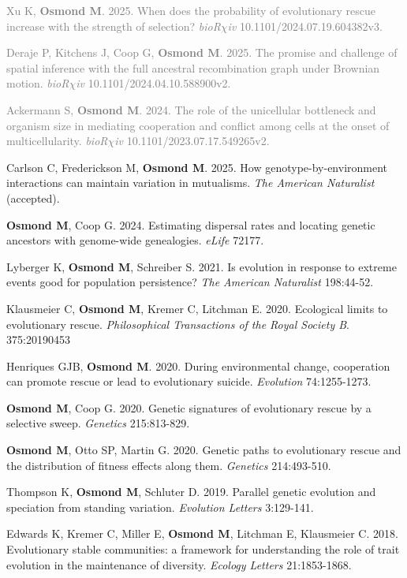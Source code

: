 \documentclass[12pt]{article}
\begin{document}
\begin{etaremune}
  \item \textcolor{gray}{Xu K, \textbf{Osmond M}. 2025. When does the probability of evolutionary rescue increase with the strength of selection? \textit{bioR$\chi$iv} 10.1101/2024.07.19.604382v3.}
  \item \textcolor{gray}{Deraje P, Kitchens J, Coop G, \textbf{Osmond M}. 2025. The promise and challenge of spatial inference with the full ancestral recombination graph under Brownian motion. \textit{bioR$\chi$iv} 10.1101/2024.04.10.588900v2.}
  \item \textcolor{gray}{Ackermann S, \textbf{Osmond M}. 2024. The role of the unicellular bottleneck and organism size in mediating cooperation and conflict among cells at the onset of multicellularity. \textit{bioR$\chi$iv} 10.1101/2023.07.17.549265v2.}
  \item Carlson C, Frederickson M, \textbf{Osmond M}. 2025. How genotype-by-environment interactions can maintain variation in mutualisms. \textit{The American Naturalist} (accepted).
  \item \textbf{Osmond M}, Coop G. 2024. Estimating dispersal rates and locating genetic ancestors with genome-wide genealogies. \textit{eLife} 72177.
  \item Lyberger K, \textbf{Osmond M}, Schreiber S. 2021. Is evolution in response to extreme events good for population persistence? \textit{The American Naturalist} 198:44-52.
  \item Klausmeier C, \textbf{Osmond M}, Kremer C, Litchman E. 2020. Ecological limits to evolutionary rescue. \textit{Philosophical Transactions of the Royal Society B}. 375:20190453
  \item Henriques GJB, \textbf{Osmond M}. 2020. During environmental change, cooperation can promote rescue or lead to evolutionary suicide. \textit{Evolution} 74:1255-1273.
  \item \textbf{Osmond M}, Coop G. 2020. Genetic signatures of evolutionary rescue by a selective sweep. \textit{Genetics} 215:813-829.
  \item \textbf{Osmond M}, Otto SP, Martin G. 2020. Genetic paths to evolutionary rescue and the distribution of fitness effects along them. \textit{Genetics} 214:493-510.
  \item Thompson K, \textbf{Osmond M}, Schluter D. 2019. Parallel genetic evolution and speciation from standing variation. \textit{Evolution Letters} 3:129-141.
  \item Edwards K, Kremer C, Miller E, \textbf{Osmond M}, Litchman E, Klausmeier C. 2018. Evolutionary stable communities: a framework for understanding the role of trait evolution in the maintenance of diversity. \textit{Ecology Letters} 21:1853-1868.

\end{etaremune}
\end{document}

